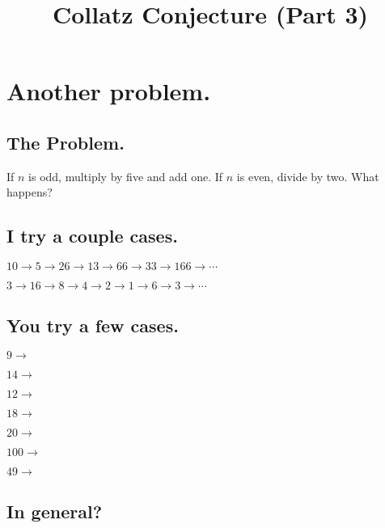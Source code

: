 \documentclass[12pt]{article}
\title{Collatz Conjecture (Part 3)}
\begin{document}
\Large

\section*{Another problem.}

\subsection*{The Problem.}

If $n$ is odd, multiply by five and add one.  If $n$ is even, divide by two.  What happens?

\subsection*{I try a couple cases.}

\noindent $10 \to 5 \to 26 \to 13 \to 66 \to 33 \to 166 \to \cdots$

\noindent $3 \to 16 \to 8 \to 4 \to 2 \to 1 \to 6 \to 3 \to \cdots$

\subsection*{You try a few cases.}

\noindent $9 \to $
\vspace{3ex}

\noindent $14 \to$
\vspace{3ex}

\noindent $12 \to$
\vspace{3ex}

\noindent $18 \to$
\vspace{3ex}

\noindent $20 \to$
\vspace{3ex}

\noindent $100 \to$
\vspace{3ex}

\noindent $49 \to$
\vspace{3ex}

\subsection*{In general?}
\end{document}
